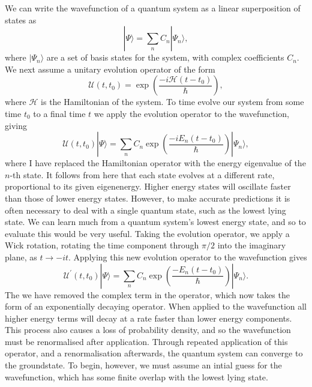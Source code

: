 We can write the wavefunction of a quantum system as a linear superposition of states as
\begin{equation}
     |\Psi \rangle = \displaystyle\sum\limits_{n} C_n |\Psi_n \rangle,
\end{equation}
where $| \Psi_n \rangle$ are a set of basis states for the system, with complex coefficients $C_n$. We next assume a unitary evolution operator of the form
\begin{equation}
    \mathscr{U}(t,t_0) = \exp\left(\frac{-i\mathcal{H}(t-t_0)}{\hbar}\right),
\end{equation}
where $\mathcal{H}$ is the Hamiltonian of the system. To time evolve our system from some time $t_0$ to a final time $t$ we apply the evolution operator to the wavefunction, giving
\begin{equation}
    \mathscr{U}(t,t_0)|\Psi \rangle = \displaystyle\sum\limits_{n} C_n \exp\left(\frac{-i{E_n}(t-t_0)}{\hbar}\right)|\Psi_n \rangle,
\end{equation}
where I have replaced the Hamiltonian operator with the energy eigenvalue of the $n$-th state. It follows from here that each state evolves at a different rate, proportional to its given eigenenergy. Higher energy states will oscillate faster than those of lower energy states. However, to make accurate predictions it is often necessary to deal with a single quantum state, such as the lowest lying state. We can learn much from a quantum system's lowest energy state, and so to evaluate this would be very useful. Taking the evolution operator, we apply a Wick rotation, rotating the time component through $\pi/2$ into the imaginary plane, as $t \rightarrow -it$. Applying this new evolution operator to the wavefunction gives
\begin{equation}
        \mathscr{U^{'}}(t,t_0)|\Psi \rangle = \displaystyle\sum\limits_{n} C_n \exp\left(\frac{-{E_n}(t-t_0)}{\hbar}\right)|\Psi_n \rangle.
\end{equation}
The we have removed the complex term in the operator, which now takes the form of an exponentially decaying operator. When applied to the wavefunction all higher energy terms will decay at a rate faster than lower energy components. This process also causes a loss of probability density, and so the wavefunction must be renormalised after application. Through repeated application of this operator, and a renormalisation afterwards, the quantum system can converge to the groundstate. To begin, however, we must assume an intial guess for the wavefunction, which has some finite overlap with the lowest lying state.

